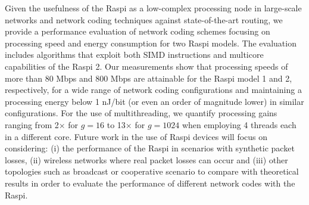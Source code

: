 \label{sec:conclusions}
Given the usefulness of the \ac{Raspi} as a low-complex
processing node in large-scale networks and network coding
techniques against state-of-the-art routing, we provide
a performance evaluation of network coding schemes focusing on
processing speed and energy consumption for two \ac{Raspi} models.
The evaluation includes algorithms that exploit both \ac{SIMD}
instructions and multicore capabilities of the \ac{Raspi} 2. Our
measurements show that processing speeds of more than 80 Mbps and 800
Mbps are attainable for the \ac{Raspi} model 1 and 2, respectively,
for a wide range of network coding configurations and maintaining
a processing energy below 1 nJ/bit (or even an order of magnitude lower)
in similar configurations. For the use of multithreading, we quantify
processing gains ranging from 2$\times$ for $g = 16$ to 13$\times$ for
$g = 1024$ when employing 4 threads each in a different core. Future
work in the use of \ac{Raspi} devices will focus on considering: (i)
the performance of the \ac{Raspi} in scenarios with synthetic packet
losses, (ii) wireless networks where real packet losses can occur
and (iii) other topologies such as broadcast or
cooperative scenario to compare with theoretical results in order to
evaluate the performance of different network codes with the \ac{Raspi}.
